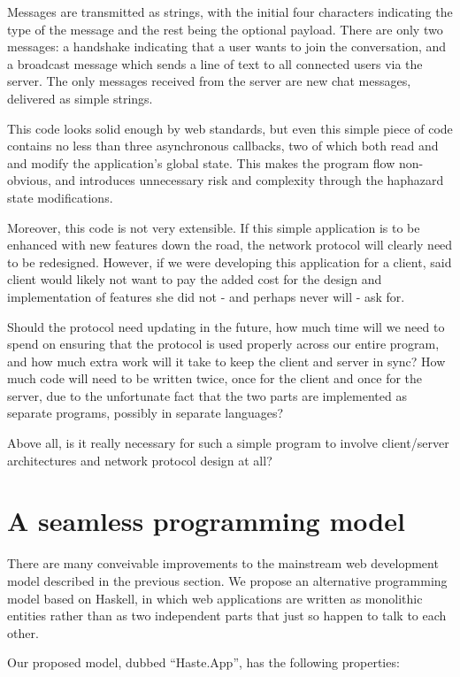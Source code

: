 \documentclass[preprint]{sigplanconf}
\begin{document}
Messages are transmitted as strings, with the initial four characters
indicating the type of the message and the rest being the optional payload.
There are only two messages: a handshake indicating that a user wants to join
the conversation, and a broadcast message which sends a line of text to all
connected users via the server. The only messages received from the server are
new chat messages, delivered as simple strings.

This code looks solid enough by web standards, but even this simple piece of
code contains no less than three asynchronous callbacks, two of which both read
and and modify the application's global state. This makes the program flow
non-obvious, and introduces unnecessary risk and complexity through the
haphazard state modifications.

Moreover, this code is not very extensible. If this simple application is to be
enhanced with new features down the road, the network protocol will clearly
need to be redesigned. However, if we were developing this application for a
client, said client would likely not want to pay the added cost for the design
and implementation of features she did not - and perhaps never will - ask for.

Should the protocol need updating in the future, how much time will we need to
spend on ensuring that the protocol is used properly across our entire program,
and how much extra work will it take to keep the client and server in sync?
How much code will need to be written twice, once for the client and once for
the server, due to the unfortunate fact that the two parts are implemented as
separate programs, possibly in separate languages?

Above all, is it really necessary for such a simple program to involve
client/server architectures and network protocol design at all?

\section{A seamless programming model}

There are many conveivable improvements to the mainstream web development model
described in the previous section. We propose an alternative programming model
based on Haskell, in which web applications are written as monolithic entities
rather than as two independent parts that just so happen to talk to each other.

Our proposed model, dubbed ``Haste.App'', has the following properties:
\end{document}
